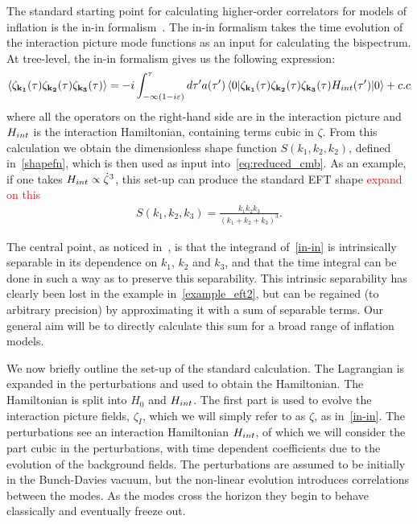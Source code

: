     The standard starting point for calculating
higher-order correlators for models of inflation is the in-in formalism~\cite{Maldacena,weinberg_in_in}.
The in-in formalism takes the time evolution of the interaction picture mode
functions as an input for calculating the bispectrum.
At tree-level, the in-in formalism gives us the
following expression:
\begin{align}
{
    \left< \zeta_{\mathbf{k_1}}(\tau)\zeta_{\mathbf{k_2}}(\tau)\zeta_{\mathbf{k_3}}(\tau) \right>
=-i\int_{-\infty(1-i\varepsilon)}^{\tau}d\tau'a(\tau')
    \left<0\lvert \zeta_{\mathbf{k_1}}(\tau)\zeta_{\mathbf{k_2}}(\tau)\zeta_{\mathbf{k_3}}(\tau)H_{int}(\tau') \rvert0\right>+c.c\label{in-in}
}
\end{align}
where all the operators on the right-hand side are in the interaction picture
and $H_{int}$ is the interaction Hamiltonian, containing terms cubic in $\zeta$.
From this calculation we obtain the dimensionless shape function $S(k_1,k_2,k_2)$,
defined in~\eqref{shapefn},
which is then used as input into~\eqref{eq:reduced_cmb}.
As an example, if one takes $H_{int}\propto\dot{\zeta}^3$, this set-up can produce the standard EFT shape
\textcolor{red}{expand on this}
\begin{align}\label{example_eft2}
    S(k_1, k_2, k_3) = \frac{k_1k_2k_3}{(k_1+k_2+k_3)^3}.
\end{align}

The central point, as noticed in~\cite{Funakoshi}, is that the
integrand of~\eqref{in-in} is intrinsically separable
in its dependence on $k_1$, $k_2$ and $k_3$, and that the time integral
can be done in such a way as to preserve this separability.
This intrinsic separability has clearly been lost in
the example in~\eqref{example_eft2},
but can be regained (to arbitrary precision) by approximating it
with a sum of separable terms. Our general aim will be to directly calculate
this sum for a broad range of inflation models.

We now briefly outline the set-up of the standard calculation.
The Lagrangian is expanded in the perturbations and used to obtain the Hamiltonian.
The Hamiltonian is split into $H_0$ and $H_{int}$.
The first part is used to evolve the interaction picture fields, $\zeta_I$,
which we will simply refer to as $\zeta$, as in~\eqref{in-in}.
The perturbations see an interaction Hamiltonian $H_{int}$,
of which we will consider the part cubic in the perturbations,
with time dependent coefficients due to the evolution of the background fields.
The perturbations are assumed to be initially in the Bunch-Davies vacuum,
but the non-linear
evolution introduces correlations between the modes.
As the modes cross the horizon they begin to behave classically
and eventually freeze out.


